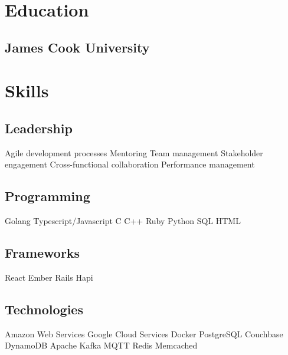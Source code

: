 \documentclass[]{tjd-cv}
\begin{document}
\begin{minipage}[t]{0.26\textwidth}


\section{Education}

\subsection{James Cook University}
\sectionsep


\section{Skills}
\subsection{Leadership}
Agile development processes \textbullet{}
Mentoring \textbullet{}
Team management \textbullet{}
Stakeholder engagement \textbullet{}
Cross-functional collaboration \textbullet{}
Performance management

\vspace{8pt}
\subsection{Programming}
Golang \textbullet{}
Typescript/Javascript \textbullet{}
C \textbullet{}
C++ \textbullet{}
Ruby \textbullet{}
Python \textbullet{}
SQL \textbullet{}
HTML

\vspace{8pt}
\subsection{Frameworks}
React \textbullet{}
Ember \textbullet{}
Rails \textbullet{}
Hapi

\vspace{8pt}
\subsection{Technologies}
Amazon Web Services \textbullet{}
Google Cloud Services \textbullet{}
Docker \textbullet{}
PostgreSQL \textbullet{}
Couchbase \textbullet{}
DynamoDB \textbullet{}
Apache Kafka \textbullet{}
MQTT \textbullet{}
Redis \textbullet{}
Memcached


\end{minipage}
\end{document}
